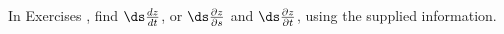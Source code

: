 {\noindent In Exercises} 
{,  find $\ds \frac{dz}{dt}$, or $\ds \frac{\partial z}{\partial s}$ and $\ds \frac{\partial z}{\partial t}$, using the supplied information. 
}
